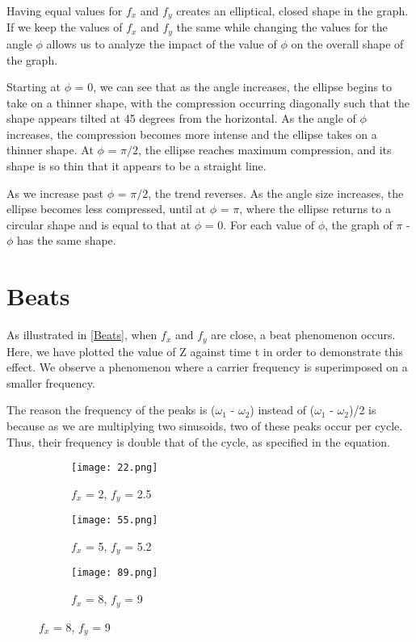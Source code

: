 \documentclass{article}
\begin{document}
Having equal values for $f_x$ and $f_y$ creates an elliptical, closed shape in the graph. If we keep the values of $f_x$ and $f_y$ the same while changing the values for the angle $\phi$ allows us to analyze the impact of the value of $\phi$ on the overall shape of the graph. 

Starting at $\phi$ = 0, we can see that as the angle increases, the ellipse begins to take on a thinner shape, with the compression occurring diagonally such that the shape appears tilted at 45 degrees from the horizontal. As the angle of $\phi$ increases, the compression becomes more intense and the ellipse takes on a thinner shape. At $\phi$ = $\pi/2$, the ellipse reaches maximum compression, and its shape is so thin that it appears to be a straight line. 

As we increase past $\phi$ = $\pi/2$, the trend reverses. As the angle size increases, the ellipse becomes less compressed, until at $\phi$ = $\pi$, where the ellipse returns to a circular shape and is equal to that at $\phi$ = 0. 
For each value of $\phi$, the graph of $\pi$ - $\phi$ has the same shape. 

\section{Beats}

As illustrated in \ref{Beats}, when $f_x$ and $f_y$ are close, a beat phenomenon occurs. Here, we have plotted the value of Z against time t in order to demonstrate this effect. We observe a phenomenon where a carrier frequency is superimposed on a smaller frequency. 

The reason the frequency of the peaks is ($\omega_1$ - $\omega_2$) instead of ($\omega_1$ - $\omega_2$)/2 is because as we are multiplying two sinusoids, two of these peaks occur per cycle. Thus, their frequency is double that of the cycle, as specified in the equation.  

\begin{figure}
    \caption{Examples of Beat Phenomenon}
    \label{Beats}

\begin{subfigure}{0.5\textwidth}
    \centering
    \texttt{[image: 22.png]}
    \caption{$f_x$ = 2, $f_y$ =  2.5}
    \label{fig:1}
\end{subfigure}
\begin{subfigure}{0.5\textwidth}
    \centering
    \texttt{[image: 55.png]}
    \caption{$f_x$ = 5, $f_y$ =  5.2}
    \label{fig:2}
\end{subfigure}
\begin{subfigure}{0.5\textwidth}
    \centering
    \texttt{[image: 89.png]}
    \caption{$f_x$ = 8, $f_y$ =  9}
    \label{fig:2}
\end{subfigure}

\end{figure}
\end{document}
